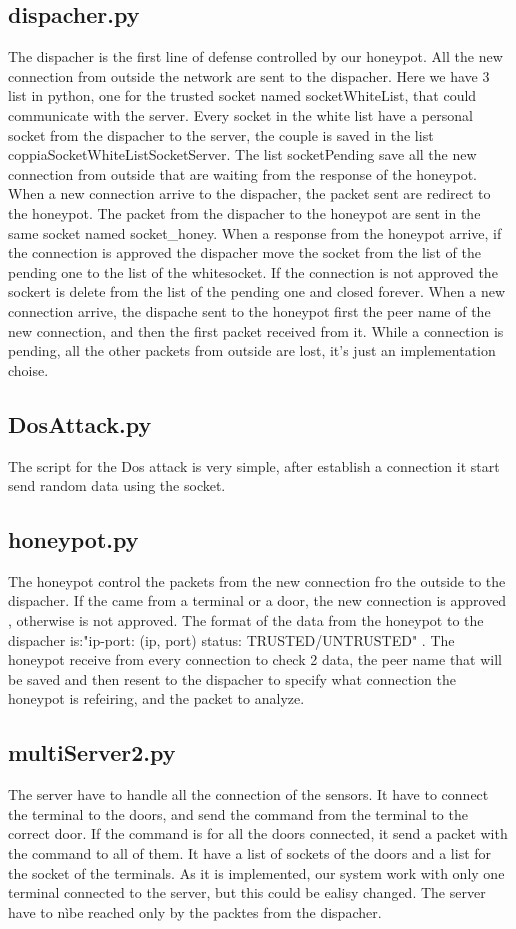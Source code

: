 \subsection{dispacher.py}
The dispacher is the first line of defense controlled by our honeypot. All the new connection from outside the network are sent to the dispacher. Here we have 3 list in python, one for the trusted socket named socketWhiteList, that could communicate with the server. Every socket in the white list have a personal socket from the dispacher to the server, the couple is saved in the list coppiaSocketWhiteListSocketServer. The list socketPending save all the new connection from outside that are waiting from the response of the honeypot. When a new connection arrive to the dispacher, the packet sent are redirect to the honeypot. The packet from the dispacher to the honeypot are sent in the same socket named socket\_honey. When a response from the honeypot arrive, if the connection is approved the dispacher move the socket from the list of the pending one to the list of the whitesocket. If the connection is not approved the sockert is delete from the list of the pending one and closed forever.  When a new connection arrive, the dispache sent to the honeypot first the peer name of the new connection, and then the first packet received from it. While a connection is pending, all the other packets from outside are lost, it's just an implementation choise.

\subsection{DosAttack.py}
The script for the Dos attack is very simple,  after establish a connection it start send random data using the socket. 


\subsection{honeypot.py}
The honeypot control the packets from the new connection fro the outside to the dispacher. If the came from a terminal or a door, the new connection is approved , otherwise is not approved. The format of the data from the honeypot to the dispacher is:"ip-port: (ip, port) status: TRUSTED/UNTRUSTED" . The honeypot receive from every connection to check 2 data, the peer name that will be saved and then resent to the dispacher to specify what connection the honeypot is refeiring, and the packet to analyze. 

\subsection{multiServer2.py}
The server have to handle all the connection of the sensors. It have to connect the terminal to the doors, and send the command from the terminal to the correct door. If the command is for all the doors connected, it send a packet with the command to all of them. It have a list of sockets of the doors and a list for the socket of the terminals. As it is implemented, our system work with only one terminal connected to the server, but this could be ealisy changed. The server have to nìbe reached only by the packtes from the dispacher. 



